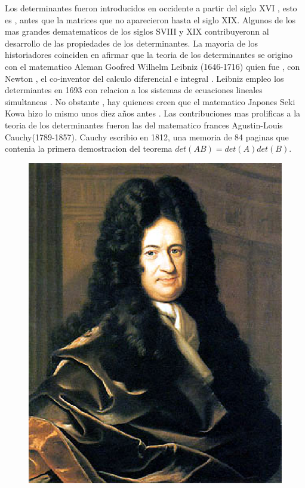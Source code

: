 \documentclass[11pt, conference]{IEEEtran}
\begin{document}
{Los determinantes fueron introducidos en occidente a partir del siglo XVI , esto es , antes que la matrices que no aparecieron hasta el siglo XIX. Algunos de los mas grandes dematematicos de los siglos SVIII y XIX contribuyeronn al desarrollo de las propiedades de los determinantes. La mayoria de los historiadores coinciden en afirmar que la teoria de los determinantes se origino con el matematico Aleman Goofred Wilhelm Leibniz (1646-1716) quien fue , con Newton , el co-inventor del calculo diferencial e integral . Leibniz empleo los determiantes en 1693 con relacion a los sistemas de ecuaciones lineales simultaneas . No obstante , hay quienees creen que el matematico Japones Seki Kowa hizo lo mismo unos diez años antes . Las contribuciones mas prolificas a la teoria de los determinantes fueron las del matematico frances Agustin-Louis Cauchy(1789-1857). Cauchy escribio en 1812, una memoria de 84 paginas que contenia la primera demostracion del teorema $det(AB)= det (A) det(B)$. 
\begin{figure}[h]
	\begin{center}
		\includegraphics[scale=0.15]{img25.eps}

\end{center}
\end{figure}}
\end{document}
